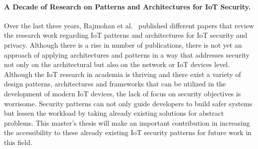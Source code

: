 \paragraph{A Decade of Research on Patterns and Architectures for IoT Security.} Over the last three years, Rajmohan et al.~\cite{Rajmohan2020, iotbds20, Rajmohan2022} published different papers that review the research work regarding IoT patterns and architectures for IoT security and privacy. Although there is a rise in number of publications, there is not yet an approach of applying architectures and patterns in a way that addresses security not only on the architectural but also on the network or IoT devices level. \\

Although the IoT research in academia is thriving and there exist a variety of design patterns, architectures and frameworks that can be utilized in the development of modern IoT devices, the lack of focus on security objectives is worrisome. Security patterns can not only guide developers to build safer systems but lessen the workload by taking already existing solutions for abstract problems. This master's thesis will make an important contribution in increasing the accessibility to these already existing IoT security patterns for future work in this field.  